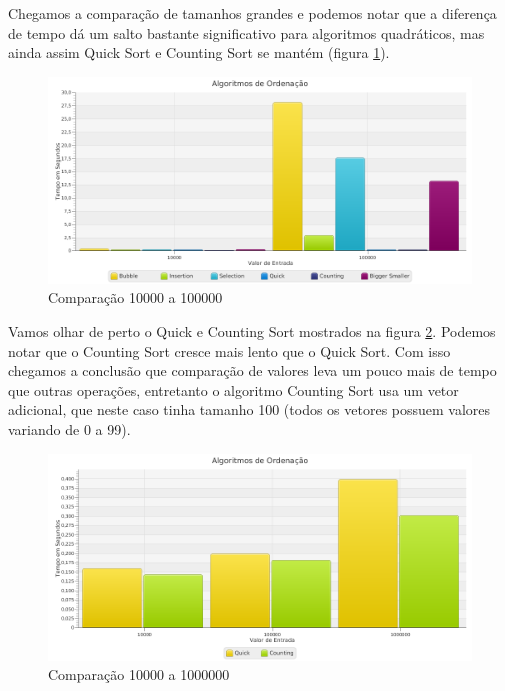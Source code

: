 Chegamos a comparação de tamanhos grandes e podemos notar que a
diferença de tempo dá um salto bastante significativo para algoritmos
quadráticos, mas ainda assim Quick Sort e Counting Sort se mantém
(figura \ref{fig:chart3}).

\begin{figure}[h]
   \includegraphics[scale=0.47]{img/charts/chart-3.png}
   \caption{Comparação 10000 a 100000}
   \label{fig:chart3}
\end{figure}

Vamos olhar de perto o Quick e Counting Sort mostrados na figura
\ref{fig:chart4}. Podemos notar que o Counting Sort cresce mais lento
que o Quick Sort. Com isso chegamos a conclusão que comparação de
valores leva um pouco mais de tempo que outras operações, entretanto o
algoritmo Counting Sort usa um vetor adicional, que neste caso tinha
tamanho 100 (todos os vetores possuem valores variando de 0 a 99).

\begin{figure}[h]
   \includegraphics[scale=0.47]{img/charts/chart-4.png}
   \caption{Comparação 10000 a 1000000}
   \label{fig:chart4}
\end{figure}
